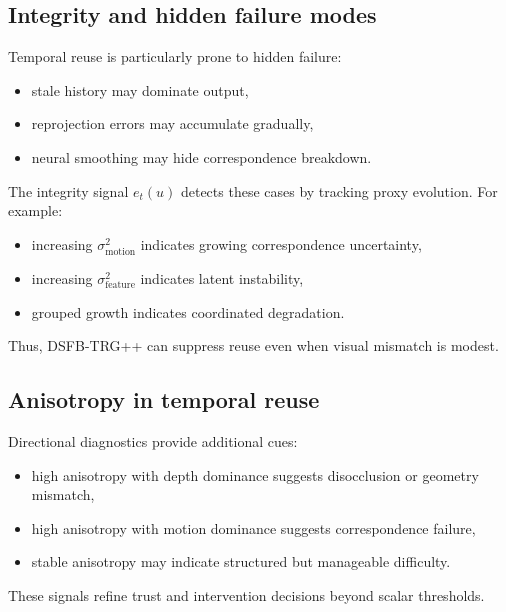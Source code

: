 \documentclass[11pt,letterpaper]{article}
\theoremstyle{gcresult}
\theoremstyle{definition}
\begin{document}

\subsection{Integrity and hidden failure modes}

Temporal reuse is particularly prone to hidden failure:
\begin{itemize}[leftmargin=1.5em]
    \item stale history may dominate output,
    \item reprojection errors may accumulate gradually,
    \item neural smoothing may hide correspondence breakdown.
\end{itemize}

The integrity signal $e_t(u)$ detects these cases by tracking proxy evolution. For example:
\begin{itemize}[leftmargin=1.5em]
    \item increasing $\sigma^{2}_{\mathrm{motion}}$ indicates growing correspondence uncertainty,
    \item increasing $\sigma^{2}_{\mathrm{feature}}$ indicates latent instability,
    \item grouped growth indicates coordinated degradation.
\end{itemize}

Thus, DSFB-TRG++ can suppress reuse even when visual mismatch is modest.


\subsection{Anisotropy in temporal reuse}

Directional diagnostics provide additional cues:
\begin{itemize}[leftmargin=1.5em]
    \item high anisotropy with depth dominance suggests disocclusion or geometry mismatch,
    \item high anisotropy with motion dominance suggests correspondence failure,
    \item stable anisotropy may indicate structured but manageable difficulty.
\end{itemize}

These signals refine trust and intervention decisions beyond scalar thresholds.
\end{document}
